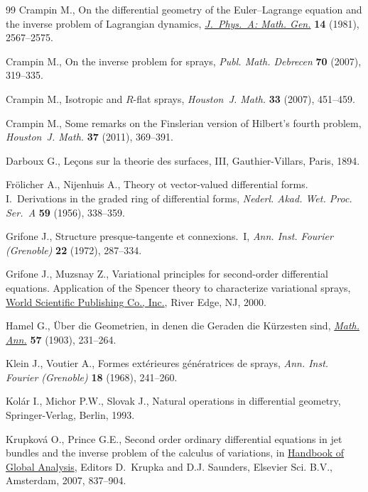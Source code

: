 \documentclass[pdftex]{sigma}
\numberwithin{equation}{section}
\begin{document}
\begin{thebibliography}{99}
Crampin M.,
On the dif\/ferential geometry  of the Euler--Lagrange equation and the inverse problem of Lagrangian dynamics,
\href{http://dx.doi.org/10.1088/0305-4470/14/10/012}{{\it  J.~Phys.~A: Math. Gen.}} {\bf 14} (1981), 2567--2575.

Crampin M.,
On the inverse problem for sprays,
{\it Publ. Math. Debrecen} {\bf 70}  (2007), 319--335.

Crampin M.,
Isotropic and $R$-f\/lat sprays,
{\it Houston~J. Math.}  {\bf 33} (2007), 451--459.

Crampin M.,
Some remarks on the Finslerian version of Hilbert's fourth problem,
{\it Houston~J. Math.}   {\bf 37} (2011), 369--391.

Darboux G.,
Le\c cons sur la theorie des surfaces, III,
Gauthier-Villars, Paris, 1894.

Fr\"olicher A., Nijenhuis A.,
Theory ot vector-valued dif\/ferential forms. I.~Derivations in the graded ring of dif\/ferential forms,
{\it Nederl. Akad. Wet. Proc. Ser.~A} {\bf 59} (1956), 338--359.

Grifone J.,
Structure presque-tangente et connexions.~I,
{\it Ann. Inst. Fourier (Grenoble)} {\bf 22}  (1972), 287--334.

Grifone J., Muzsnay Z.,
Variational principles for second-order dif\/ferential equations. Application of the Spencer theory to characterize variational sprays,
\href{http://dx.doi.org/10.1142/9789812813596}{World Scientif\/ic Publishing Co., Inc.}, River Edge, NJ, 2000.

Hamel G.,
\"Uber die Geometrien, in denen die Geraden die K\"urzesten sind,
\href{http://dx.doi.org/10.1007/BF01444348}{{\it Math. Ann.}} {\bf 57} (1903), 231--264.

Klein J.,  Voutier A.,
Formes ext\'erieures g\'en\'eratrices de sprays,
{\it Ann. Inst. Fourier (Grenoble)} {\bf 18} (1968), 241--260.

Kol\'ar I., Michor P.W., Slovak J.,
Natural operations in dif\/ferential geometry,
Springer-Verlag, Berlin, 1993.

Krupkov\'a O., Prince G.E.,
Second order ordinary dif\/ferential equations in jet bundles and the inverse  problem of the calculus of variations,
 in \href{http://dx.doi.org/10.1016/B978-044452833-9.50017-6}{Handbook of Global Analysis}, Editors D.~Krupka and D.J. Saunders,   Elsevier Sci. B.V., Amsterdam,  2007, 837--904.


\end{thebibliography}
\end{document}
